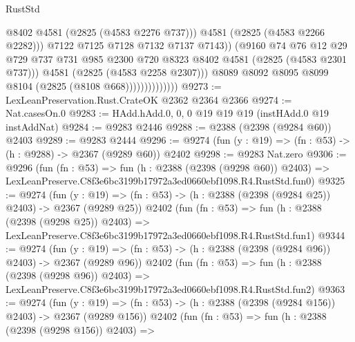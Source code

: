 \begin{lexlean}{RustStd}
\begin{coremodule}
                                      @8402
                                      @4581
                                      (@2825 (@4583 @2276 @737)))
                                    @4581
                                    (@2825 (@4583 @2266 @2282)))
                                  @7122
                                  @7125
                                  @7128
                                  @7132
                                  @7137
                                  @7143))
                              (@9160
                                @74
                                @76
                                @12
                                @29
                                @729
                                @737
                                @731
                                @985
                                @2300
                                @720
                                @8323
                                @8402
                                @4581
                                (@2825 (@4583 @2301 @737)))
                              @4581
                              (@2825 (@4583 @2258 @2307)))
                            @8089
                            @8092
                            @8095
                            @8099
                            @8104
                            (@2825 (@8108 @668))))))))))))))
@9273 := LexLeanPreservation.Rust.CrateOK @2362 @2364 @2366
@9274 := Nat.casesOn.{0}
@9283 := HAdd.hAdd.{0, 0, 0} @19 @19 @19 (instHAdd.{0} @19 instAddNat)
@9284 := @9283 @2446
@9288 := @2388 (@2398 (@9284 @60)) @2403
@9289 := @9283 @2444
@9296 := @9274 (fun (y : @19) => (fn : @53) -> (h : @9288) -> @2367 (@9289 @60)) @2402
@9298 := @9283 Nat.zero
@9306 := @9296
    (fun (fn : @53) =>
    fun (h : @2388 (@2398 (@9298 @60)) @2403) =>
    LexLeanPreserve.C8f3e6bc3199b17972a3ed0660ebf1098.R4.RustStd.fun0)
@9325 := @9274
    (fun (y : @19) => (fn : @53) -> (h : @2388 (@2398 (@9284 @25)) @2403) -> @2367 (@9289 @25))
    @2402
    (fun (fn : @53) =>
    fun (h : @2388 (@2398 (@9298 @25)) @2403) =>
    LexLeanPreserve.C8f3e6bc3199b17972a3ed0660ebf1098.R4.RustStd.fun1)
@9344 := @9274
    (fun (y : @19) => (fn : @53) -> (h : @2388 (@2398 (@9284 @96)) @2403) -> @2367 (@9289 @96))
    @2402
    (fun (fn : @53) =>
    fun (h : @2388 (@2398 (@9298 @96)) @2403) =>
    LexLeanPreserve.C8f3e6bc3199b17972a3ed0660ebf1098.R4.RustStd.fun2)
@9363 := @9274
    (fun (y : @19) => (fn : @53) -> (h : @2388 (@2398 (@9284 @156)) @2403) -> @2367 (@9289 @156))
    @2402
    (fun (fn : @53) =>
    fun (h : @2388 (@2398 (@9298 @156)) @2403) =>

\end{coremodule}
\end{lexlean}
